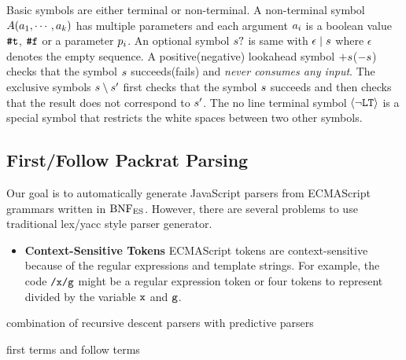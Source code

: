 Basic symbols are either terminal or non-terminal.
A non-terminal symbol \( A(a_1, \cdots, a_k) \)
has multiple parameters and each argument \( a_i \) is
a boolean value \( \texttt{\#t} \), \( \texttt{\#f} \) or a parameter \( p_i \).
An optional symbol \( s? \) is same with \( \epsilon \mid s \)
where \( \epsilon \) denotes the empty sequence.
A positive(negative) lookahead symbol \( +s \)(\( -s \))
checks that the symbol \( s \) succeeds(fails) and
\textit{never consumes any input}.
The exclusive symbols \( s \setminus s' \)
first checks that the symbol \( s \) succeeds
and then checks that the result does not correspond to \( s' \).
The no line terminal symbol \( \left<\neg\texttt{LT}\right> \) is a special symbol
that restricts the white spaces between two other symbols.

\subsection{First/Follow Packrat Parsing}

Our goal is to automatically generate JavaScript parsers from ECMAScript
grammars written in \( \text{BNF}_{\text{ES}} \). However, there are several problems
to use traditional lex/yacc style parser generator.
\begin{itemize}
  \item \textbf{Context-Sensitive Tokens} ECMAScript tokens are context-sensitive
    because of the regular expressions and template strings.
    For example, the code \( \texttt{/x/g} \) might be a regular expression token
    or four tokens to represent divided by the variable \( \texttt{x} \) and \( \texttt{g} \).
\end{itemize}

% 
% 
% 
% 
% 
% 
% 
combination of recursive descent parsers with predictive parsers

first terms and follow terms


